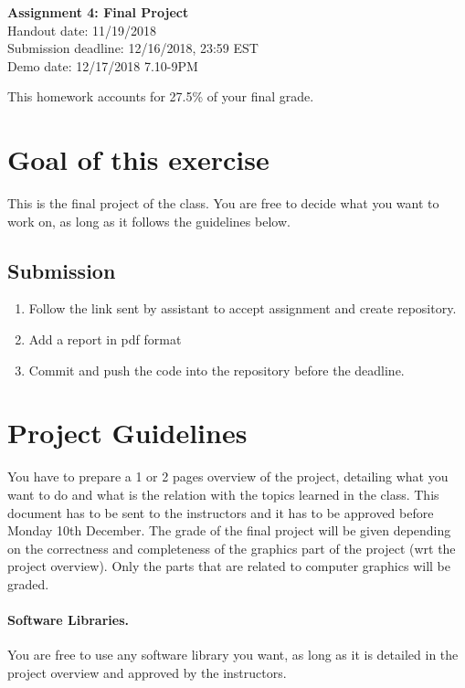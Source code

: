 \documentclass[11pt]{article}
\begin{document}
\hspace{50pt}

\begin{center}

{\Huge \textbf{Assignment 4: Final Project}}\\
\vspace{10pt}
Handout date: 11/19/2018\\
Submission deadline: 12/16/2018,  23:59 EST\\
Demo date: 12/17/2018 7.10-9PM
\end{center}

\noindent This homework accounts for 27.5\% of your final grade. 

\section*{Goal of this exercise}
This is the final project of the class. You are free to decide what you want to work on, as long as it follows the guidelines below.

\subsection*{Submission}

\begin{enumerate}
\item Follow the link sent by assistant to accept assignment and create repository.
\item Add a report in pdf format 
\item Commit and push the code into the repository before the deadline.
\end{enumerate}

\section{Project Guidelines}

You have to prepare a 1 or 2 pages overview of the project, detailing what you want to do and what is the relation with the topics learned in the class. This document has to be sent to the instructors and it has to be approved before Monday 10th December. The grade of the final project will be given depending on the correctness and completeness of the graphics part of the project (wrt the project overview). Only the parts that are related to computer graphics will be graded.

\paragraph{Software Libraries.} You are free to use any software library you want, as long as it is detailed in the project overview and approved by the instructors.
\end{document}
